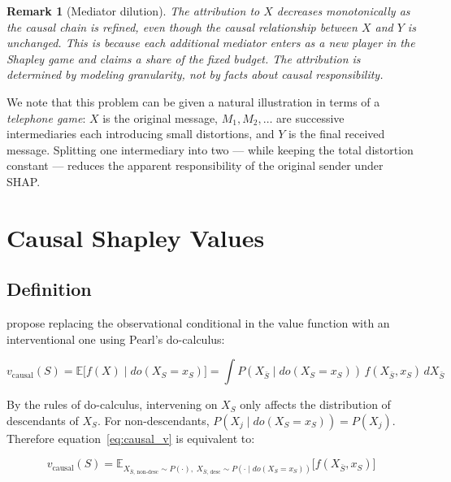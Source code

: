 \documentclass[12pt]{article}
\newtheorem{remark}{Remark}
\begin{document}
\begin{remark}[Mediator dilution]
The attribution to $X$ decreases monotonically as the causal chain is refined, even though
the causal relationship between $X$ and $Y$ is unchanged. This is because each additional
mediator enters as a new player in the Shapley game and claims a share of the fixed budget.
The attribution is determined by modeling granularity, not by facts about causal responsibility.
\end{remark}

We note that this problem can be given a natural illustration in terms of a \emph{telephone
game}: $X$ is the original message, $M_1, M_2, \ldots$ are successive intermediaries each
introducing small distortions, and $Y$ is the final received message. Splitting one
intermediary into two --- while keeping the total distortion constant --- reduces the
apparent responsibility of the original sender under SHAP.

\section{Causal Shapley Values}

\subsection{Definition}

\citet{heskes2020causal} propose replacing the observational conditional in the value
function with an interventional one using Pearl's do-calculus:

\begin{equation}
v_{\text{causal}}(S) = \mathbb{E}\bigl[f(X) \mid do(X_S = x_S)\bigr]
= \int P(X_{\bar{S}} \mid do(X_S = x_S))\, f(X_{\bar{S}}, x_S)\, dX_{\bar{S}}
\label{eq:causal_v}
\end{equation}

By the rules of do-calculus, intervening on $X_S$ only affects the distribution of
descendants of $X_S$. For non-descendants, $P(X_j \mid do(X_S = x_S)) = P(X_j)$.
Therefore equation~\eqref{eq:causal_v} is equivalent to:

\begin{equation}
v_{\text{causal}}(S) = \mathbb{E}_{X_{\bar{S},\,\text{non-desc}} \sim P(\cdot),\;
X_{\bar{S},\,\text{desc}} \sim P(\cdot \mid do(X_S=x_S))}\bigl[f(X_{\bar{S}}, x_S)\bigr]
\end{equation}
\end{document}
